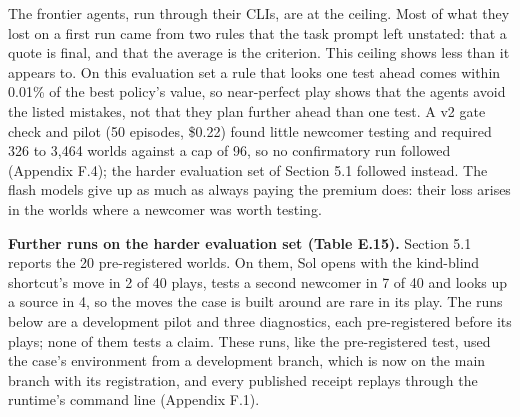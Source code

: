The frontier agents, run through their CLIs, are at the ceiling. Most of what they lost on a first run came from
two rules that the task prompt left unstated: that a quote is final, and that the average is the criterion. This
ceiling shows less than it appears to. On this evaluation set a rule that looks one test ahead comes within 0.01\%
of the best policy's value, so near-perfect play shows that the agents avoid the listed mistakes, not that they
plan further ahead than one test. A v2 gate check and pilot (50 episodes, \$0.22) found little newcomer testing and
required 326 to 3,464 worlds against a cap of 96, so no confirmatory run followed (Appendix F.4); the harder
evaluation set of Section 5.1 followed instead. The flash models give up as much as always paying the premium does:
their loss arises in the worlds where a newcomer was worth testing.

\textbf{Further runs on the harder evaluation set (Table E.15).} Section 5.1 reports the 20 pre-registered worlds. On
them, Sol opens with the kind-blind shortcut's move in 2 of 40 plays, tests a second newcomer in 7 of 40 and looks up
a source in 4, so the moves the case is built around are rare in its play. The runs below are a development pilot
and three diagnostics, each pre-registered before its plays; none of them tests a claim. These runs, like the
pre-registered test, used the case's environment from a development branch, which is now on the main branch with its
registration, and every published receipt replays through the runtime's command line (Appendix F.1).

